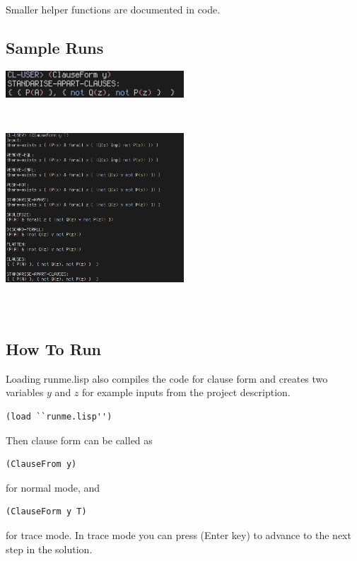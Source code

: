 \documentclass[paper=a4, fontsize=11pt]{scrartcl}
\numberwithin{equation}{section}		%
\numberwithin{figure}{section}			%
\numberwithin{table}{section}				%
\begin{document}
Smaller helper functions are documented in code.


\subsection{Sample Runs}
\includegraphics[width=0.5\textwidth]{cnf.png} \\
\includegraphics[width=0.5\textwidth, height=8cm]{cnf-trace.png} \\

\subsection{How To Run}
Loading runme.lisp also compiles the code for clause form and creates two
variables $ y$ and $z$ for example inputs from the project description.
\begin{lstlisting}
(load ``runme.lisp'')
\end{lstlisting}
Then clause form can be called as
\begin{lstlisting}
(ClauseFrom y)
\end{lstlisting}
for normal mode, and
\begin{lstlisting}
(ClauseForm y T)
\end{lstlisting}
for trace mode. In trace mode you can press (Enter key) to advance to the next
step in the solution.
\end{document}
